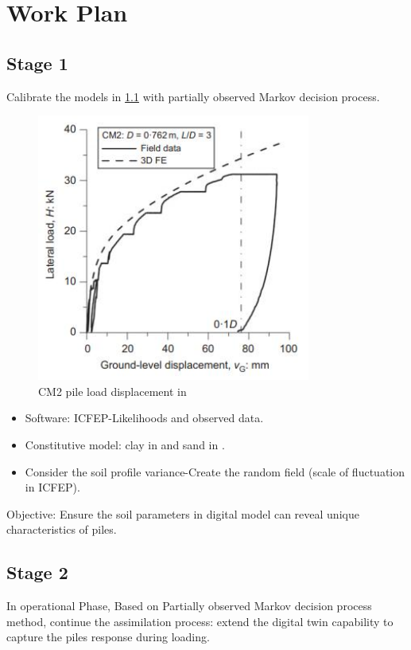 \chapter{Work Plan}

\label{Work_Plan}

\section{Stage 1}
Calibrate the models in \cref{fig:fig4.1} with partially observed Markov decision process.

\begin{figure}[htbp]
    \centering
    \includegraphics[width = 90mm]{Figures/figure4.jpg}
    \caption{CM2 pile load displacement in \protect\cite{zdravkovic2020}}
    \label{fig:fig4.1}
\end{figure}

\begin{itemize}
    \item Software: ICFEP-Likelihoods and observed data.
    \item Constitutive model: clay in \cite{zdravkovic2020} and sand in \cite{taborda2020}.
    \item Consider the soil profile variance-Create the random field (scale of fluctuation in ICFEP).
\end{itemize}
Objective: Ensure the soil parameters in digital model can reveal unique characteristics of piles.

\section{Stage 2}
In operational Phase, Based on Partially observed Markov decision process method, continue the assimilation process: extend the digital twin capability to capture the piles response during loading.

